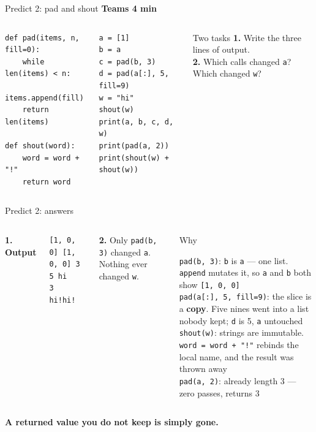 \documentclass[aspectratio=169]{beamer}
\newcommand{\keyline}[1]{\vfill\begin{center}\textcolor{bkblue}{\textbf{#1}}\end{center}\vspace*{0.2em}}
\newcommand{\code}[1]{\texttt{#1}}
\newcommand{\neutrallabel}[1]{\textcolor{bkblue}{\textbf{#1}}}
\newcommand{\timing}[2]{\hfill{\small\textcolor{bkblue}{\textbf{#1 \textbullet{} #2}}}}
\begin{document}
\begin{frame}[fragile]{Predict 2: pad and shout \timing{Teams}{4 min}}
  \begin{columns}[T,onlytextwidth]
\begin{lstlisting}[language=Py]
def pad(items, n, fill=0):
    while len(items) < n:
        items.append(fill)
    return len(items)

def shout(word):
    word = word + "!"
    return word
\end{lstlisting}
\begin{lstlisting}[language=Py]
a = [1]
b = a
c = pad(b, 3)
d = pad(a[:], 5, fill=9)
w = "hi"
shout(w)
print(a, b, c, d, w)
print(pad(a, 2))
print(shout(w) + shout(w))
\end{lstlisting}
    \begin{discussionbox}{Two tasks}
      \small
      \textbf{1.} Write the three lines of output.\\[0.2em]
      \textbf{2.} Which calls changed \code{a}? Which changed \code{w}?
    \end{discussionbox}
  \end{columns}
\end{frame}

\begin{frame}[fragile]{Predict 2: answers}
  \begin{columns}[T,onlytextwidth]
    \neutrallabel{1. Output}
\begin{lstlisting}
[1, 0, 0] [1, 0, 0] 3 5 hi
3
hi!hi!
\end{lstlisting}
    \neutrallabel{2.}
    {\small Only \code{pad(b, 3)} changed \code{a}. Nothing ever changed \code{w}.}
    \begin{contextbox}{Why}
      \footnotesize\raggedright
      \code{pad(b, 3)}: \code{b} is \code{a} --- one list. \code{append} mutates it, so
      \code{a} and \code{b} both show \code{[1, 0, 0]}\\[0.25em]
      \code{pad(a[:], 5, fill=9)}: the slice is a \textbf{copy}. Five nines went into a
      list nobody kept; \code{d} is 5, \code{a} untouched\\[0.25em]
      \code{shout(w)}: strings are immutable. \code{word = word + "!"} rebinds the local
      name, and the result was thrown away\\[0.25em]
      \code{pad(a, 2)}: already length 3 --- zero passes, returns 3
    \end{contextbox}
  \end{columns}
  \keyline{A returned value you do not keep is simply gone.}
\end{frame}
\end{document}
